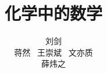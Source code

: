 \documentclass[11pt, openany]{book}
\begin{document}
    \title{\Huge \heiti 化学中的数学}
    \author{\kaishu 刘剑 \\ \kaishu 蒋然 \ \kaishu 王崇斌 \ \kaishu 文亦质 \\ \kaishu 薛炜之}
    \maketitle
    \tableofcontents

    \setlength\parskip{0.62 em}
    \mainmatter

    
    
    
    
    
    
    
    
\end{document}
